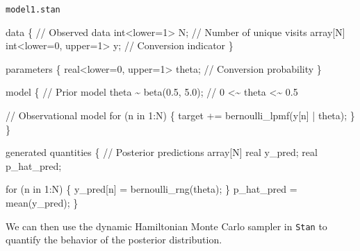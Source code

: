 \documentclass[
  letterpaper,
  DIV=11,
  numbers=noendperiod]{scrartcl}
\newenvironment{Shaded}{\begin{snugshade}}{\end{snugshade}}
\newcommand{\CommentTok}[1]{\textcolor[rgb]{0.37,0.37,0.37}{#1}}
\newcommand{\ControlFlowTok}[1]{\textcolor[rgb]{0.00,0.23,0.31}{#1}}
\newcommand{\DataTypeTok}[1]{\textcolor[rgb]{0.68,0.00,0.00}{#1}}
\newcommand{\DecValTok}[1]{\textcolor[rgb]{0.68,0.00,0.00}{#1}}
\newcommand{\FloatTok}[1]{\textcolor[rgb]{0.68,0.00,0.00}{#1}}
\newcommand{\KeywordTok}[1]{\textcolor[rgb]{0.00,0.23,0.31}{#1}}
\newcommand{\NormalTok}[1]{\textcolor[rgb]{0.00,0.23,0.31}{#1}}
\begin{document}
\begin{codelisting}

\caption{\texttt{model1.stan}}

\begin{Shaded}
\begin{Highlighting}[]
\KeywordTok{data}\NormalTok{ \{}
  \CommentTok{// Observed data}
  \DataTypeTok{int}\NormalTok{\textless{}}\KeywordTok{lower}\NormalTok{=}\DecValTok{1}\NormalTok{\textgreater{} N;                   }\CommentTok{// Number of unique visits}
  \DataTypeTok{array}\NormalTok{[N] }\DataTypeTok{int}\NormalTok{\textless{}}\KeywordTok{lower}\NormalTok{=}\DecValTok{0}\NormalTok{, }\KeywordTok{upper}\NormalTok{=}\DecValTok{1}\NormalTok{\textgreater{} y; }\CommentTok{// Conversion indicator}
\NormalTok{\}}

\KeywordTok{parameters}\NormalTok{ \{}
  \DataTypeTok{real}\NormalTok{\textless{}}\KeywordTok{lower}\NormalTok{=}\DecValTok{0}\NormalTok{, }\KeywordTok{upper}\NormalTok{=}\DecValTok{1}\NormalTok{\textgreater{} theta; }\CommentTok{// Conversion probability}
\NormalTok{\}}

\KeywordTok{model}\NormalTok{ \{}
  \CommentTok{// Prior model}
\NormalTok{  theta \textasciitilde{} beta(}\FloatTok{0.5}\NormalTok{, }\FloatTok{5.0}\NormalTok{); }\CommentTok{// 0 \textless{}\textasciitilde{} theta \textless{}\textasciitilde{} 0.5}

  \CommentTok{// Observational model}
  \ControlFlowTok{for}\NormalTok{ (n }\ControlFlowTok{in} \DecValTok{1}\NormalTok{:N) \{}
    \KeywordTok{target +=}\NormalTok{ bernoulli\_lpmf(y[n] | theta);}
\NormalTok{  \}}
\NormalTok{\}}

\KeywordTok{generated quantities}\NormalTok{ \{}
  \CommentTok{// Posterior predictions}
  \DataTypeTok{array}\NormalTok{[N] }\DataTypeTok{real}\NormalTok{ y\_pred;}
  \DataTypeTok{real}\NormalTok{ p\_hat\_pred;}

  \ControlFlowTok{for}\NormalTok{ (n }\ControlFlowTok{in} \DecValTok{1}\NormalTok{:N) \{}
\NormalTok{    y\_pred[n] = bernoulli\_rng(theta);}
\NormalTok{  \}}
\NormalTok{  p\_hat\_pred = mean(y\_pred);}
\NormalTok{\}}
\end{Highlighting}
\end{Shaded}

\end{codelisting}

We can then use the dynamic Hamiltonian Monte Carlo sampler in
\texttt{Stan} to quantify the behavior of the posterior distribution.
\end{document}
